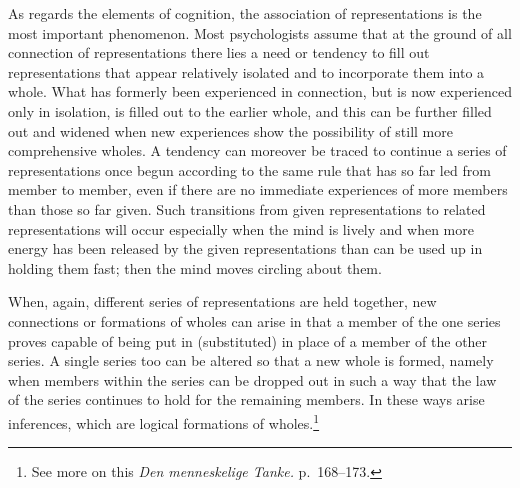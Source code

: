 \documentclass[12pt]{book}
\newcommand{\opage}[1]{\marginnote{\footnotesize\textit{[#1]}}}
\begin{document}
\opage{17}As regards the elements of cognition, the association of
representations is the most important phenomenon. Most psychologists assume that
at the ground of all connection of representations there lies a need or
tendency to fill out representations that appear relatively isolated and to
incorporate them into a whole. What has formerly been experienced in connection,
but is now experienced only in isolation, is filled out to the earlier whole, and
this can be further filled out and widened when new experiences show the
possibility of still more comprehensive wholes. A tendency can moreover be traced
to continue a series of representations once begun according to the same rule
that has so far led from member to member, even if there are no immediate
experiences of more members than those so far given. Such transitions from given
representations to related representations will occur especially when the mind is
lively and when more energy has been released by the given representations than
can be used up in holding them fast; then the mind moves circling about them.

When, again, different series of representations are held together, new
connections or formations of wholes can arise in that a member of the one series
proves capable of being put in (substituted) in place of a member of the other
series. A single series too can be altered so that a new whole is formed, namely
when members within the series can be dropped out in such a way that the law of
the series continues to hold for the remaining members. In these ways arise
inferences, which are logical formations of wholes.\footnote{See more on this
\textit{Den menneskelige Tanke.} p.~168--173.}
\end{document}
